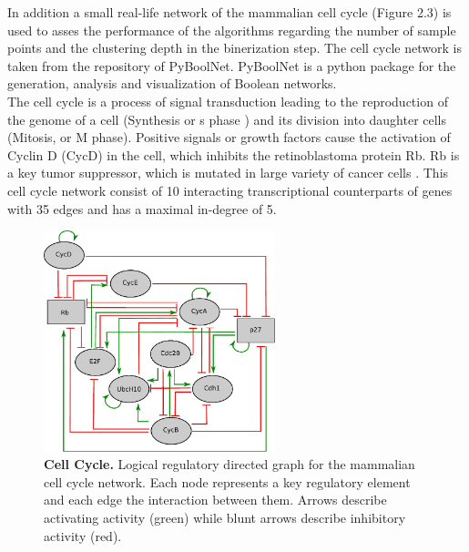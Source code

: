 \citep{Klarner.2017}\cite{Faure.2006}
In addition a small real-life network of the mammalian cell cycle (Figure 2.3) is used to asses the performance of the algorithms regarding the number of sample points and the clustering depth in the binerization step. The cell cycle network is taken from the repository of PyBoolNet. PyBoolNet is a python package for the generation, analysis and visualization of Boolean networks.\\
\citep{Klarner.2017}
The cell cycle is a process of signal transduction leading to the reproduction of the genome of a cell (Synthesis or s phase ) and its division into daughter cells (Mitosis, or M phase). Positive signals or growth factors cause the activation of Cyclin D (CycD) in the cell, which inhibits the retinoblastoma protein Rb. Rb is a key tumor suppressor, which is mutated in large variety of cancer cells \citep{CooperGM.2000}.
This cell cycle network consist of 10 interacting transcriptional counterparts of genes with 35 edges and has a maximal in-degree of 5.
\captionsetup{width=0.8\linewidth}
\begin{figure}[H]
\centering
\includegraphics[width=0.6\textwidth]{./Bilder/cellcycle.pdf}
\caption[Cell cycle]{\textbf{Cell Cycle.} Logical regulatory directed graph for the mammalian cell cycle network. Each node represents a key regulatory element and each edge the interaction between them. Arrows describe activating activity (green) while blunt arrows describe inhibitory activity (red).}
\label{fig:9}
\end{figure}

